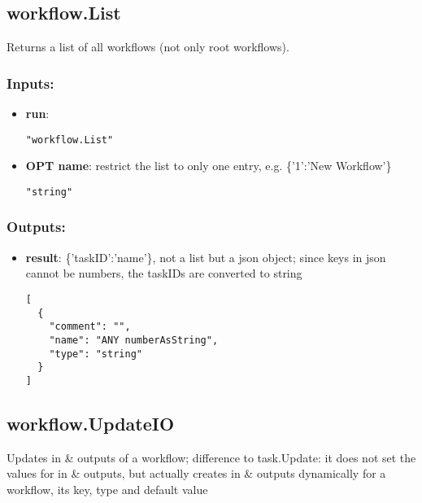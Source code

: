 \subsection{workflow.List}
Returns a list of all workflows (not only root workflows).
\subsubsection*{Inputs:}
\begin{itemize}
    \item \textbf{run}: 
\begin{lstlisting}
"workflow.List"
\end{lstlisting}
    \item \textbf{OPT name}: restrict the list to only one entry, e.g. \{'1':'New Workflow'\}
\begin{lstlisting}
"string"
\end{lstlisting}
  \end{itemize}

\subsubsection*{Outputs:}
\begin{itemize}
    \item \textbf{result}: \{'taskID':'name'\}, not a list but a json object; since keys in json cannot be numbers, the taskIDs are converted to string
\begin{lstlisting}
[
  {
    "comment": "", 
    "name": "ANY numberAsString", 
    "type": "string"
  }
]
\end{lstlisting}
  \end{itemize}

\subsection{workflow.UpdateIO}
Updates
 in \& outputs of a workflow; difference to task.Update: it does not 
set the values for in \& outputs, but actually creates in \& 
outputs dynamically for a workflow, its key, type and default value
